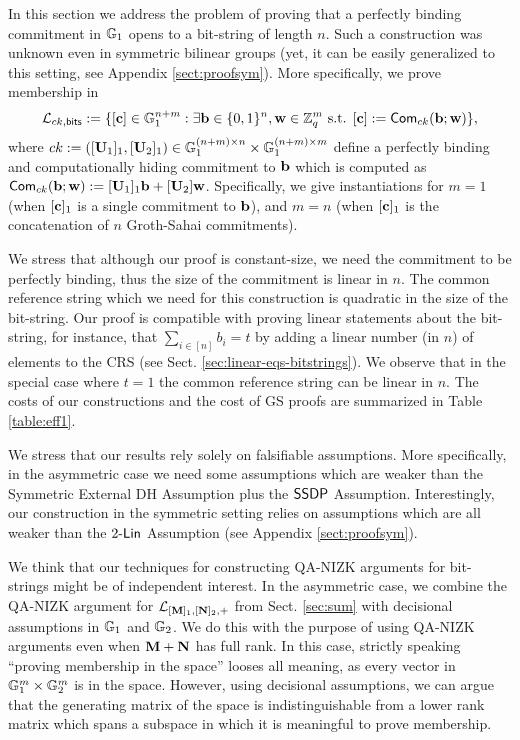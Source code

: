 In this section we address the problem of proving that a perfectly binding commitment in $\mathbb{G}_1$ opens to a bit-string of length $n$.   
Such a construction was unknown even in symmetric bilinear groups (yet, it can be easily generalized to this setting, see  Appendix \ref{sect:proofsym}).
More specifically, we prove membership in 
$$\mathcal{\mathcal{L}}_{ck,\mathsf{bits}} := 
    \{[\mathbf{c}] \in \mathbb{G}_1^{n+m}: \exists \mathbf{b}\in\{0,1\}^n,\mathbf{w}\in\mathbb{Z}_q^m \text{ s.t. }
        [\mathbf{c}]:=  \mathsf{Com}_{ck}(\mathbf{b};\mathbf{w})
    \},$$
 where $ck:=([\mathbf{{U}}_1]_1,[\mathbf{{U}}_2]_1)\in\mathbb{G}_1^{(n+m)\times n}\times\mathbb{G}_1^{(n+m)\times m}$ define a perfectly binding and computationally hiding commitment to $\mathbf{b}$ which is computed as $\mathsf{Com}_{ck}(\mathbf{b};\allowbreak\mathbf{w}):=[\mathbf{{U}}_1]_1\mathbf{b}+[\mathbf{{U}}_2]\mathbf{w}$. Specifically, we give instantiations for $m=1$ (when $[\mathbf{c}]_1$ is a single commitment to $\mathbf{b}$), and $m=n$ (when $[\mathbf{c}]_1$ is the concatenation  of $n$ Groth-Sahai commitments).

We stress that although our proof is constant-size, we need the commitment to be perfectly binding, thus the size of the commitment is linear in $n$.  The common reference string  which we need for this construction is quadratic in the size of the bit-string. Our proof is compatible with proving linear statements about the bit-string, for instance,  
that $\sum_{i \in [n]} b_i=t$ by adding a linear number (in $n$) of elements to the CRS (see Sect. \ref{sec:linear-eqs-bitstrings}). We observe that in the special case where $t=1$ the common reference string can be linear in $n$. The costs of our constructions and the cost of GS proofs are summarized in Table \ref{table:eff1}.

We stress that our results rely solely on falsifiable assumptions. More specifically, in the asymmetric case we need some assumptions which are weaker 
than the Symmetric External DH Assumption %
plus the $\mathsf{SSDP}$ Assumption. Interestingly, our construction in the symmetric setting relies on assumptions which are all weaker than the $2\mbox{-}\mathsf{Lin}$ Assumption (see Appendix \ref{sect:proofsym}).

We think that our techniques for constructing QA-NIZK arguments for bit-strings might be of independent interest. 
In the asymmetric case, we combine the QA-NIZK argument for $\mathcal{L}_{[\mathbf{{M}}]_1,[\mathbf{{N}}]_2,+}$ from Sect. \ref{sec:sum} with decisional assumptions in $\mathbb{G}_1$ and $\mathbb{G}_2$. We do this with the purpose of using QA-NIZK arguments even when $\mathbf{{M}}+\mathbf{{N}}$ has full rank. In this case, strictly speaking ``proving membership in the space'' looses all meaning, as every vector in $\mathbb{G}_1^m\times \mathbb{G}_2^m$ is in the space. However, using decisional assumptions, we can argue that the generating matrix of the space is indistinguishable from a lower rank matrix which spans a subspace in which it is meaningful to prove membership.  

